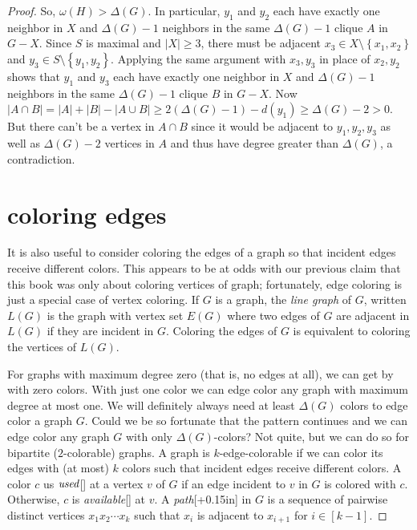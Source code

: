 \documentclass{amsbook}
\newcommand{\aaside}[2]{\marginnote{\scriptsize{#1}}[#2]}
\theoremstyle{plain}
\numberwithin{equation}{chapter}
\newcommand{\set}[1]{\left\{ #1 \right\}}
\newcommand{\card}[1]{\left|#1\right|}
\newcommand{\irange}[1]{\left[#1\right]}
\begin{document}
\begin{proof}
So, $\omega(H) > \Delta(G)$.  In particular, $y_1$ and $y_2$ each have exactly one neighbor in $X$ and $\Delta(G) - 1$ neighbors in the same $\Delta(G) -1$ clique $A$ in $G - X$.
 Since $S$ is maximal and $\card{X} \ge 3$, there must be adjacent
$x_3 \in X \setminus \set{x_1,x_2}$ and $y_3 \in S \setminus \set{y_1,y_2}$.  Applying the same argument with $x_3, y_3$ in place of $x_2, y_2$ shows
that $y_1$ and $y_3$ each have exactly one neighbor in $X$ and $\Delta(G) - 1$ neighbors in the same $\Delta(G) -1$ clique $B$ in $G - X$.
Now $\card{A\cap B} = \card{A} + \card{B} - \card{A\cup B} \ge 2(\Delta(G) - 1) - d(y_1) \ge \Delta(G) - 2 > 0$.  But there can't be a vertex
in $A \cap B$ since it would be adjacent to $y_1,y_2,y_3$ as well as $\Delta(G) - 2$ vertices in $A$ and thus have degree greater than $\Delta(G)$, a contradiction. 

\chapter*{coloring edges}
It is also useful to consider coloring the edges of a graph so that incident edges receive different colors.  This
appears to be at odds with our previous claim that this book was only about coloring vertices of graph; fortunately, edge coloring
is just a special case of vertex coloring.  If $G$ is a graph, the \emph{line graph} of $G$, written
$L(G)$ is the graph with vertex set $E(G)$ where two edges of $G$ are adjacent in $L(G)$ if they are incident in $G$.  Coloring
the edges of $G$ is equivalent to coloring the vertices of $L(G)$.

For graphs with maximum degree zero (that is, no edges at all), we can get by with zero colors.  
With just one color we can edge color any graph with maximum degree at most one.  We will definitely always need at least $\Delta(G)$ colors
to edge color a graph $G$.  Could we be so fortunate that the pattern continues
and we can edge color any graph $G$ with only $\Delta(G)$-colors? Not quite, but we can do so for bipartite ($2$-colorable) graphs.
A graph is $k$-edge-colorable if we can color its edges with (at most) $k$ colors such that incident edges receive different colors.
A color $c$ us $\emph{used}$\aaside{used}{} at a vertex $v$ of $G$ if an edge incident to $v$ in $G$ is colored with $c$. Otherwise, $c$ is \emph{available}\aaside{available}{} at $v$.
A \emph{path}\aaside{path}{+0.15in} in $G$ is a sequence of pairwise distinct vertices $x_1x_2\cdots x_k$ such that $x_i$ is adjacent to $x_{i+1}$ for $i \in \irange{k-1}$.


\end{proof}
\end{document}

